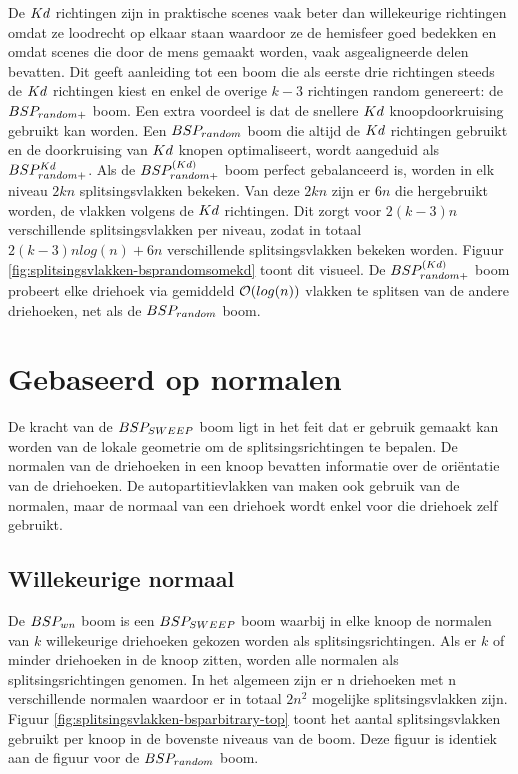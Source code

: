 De $Kd$ richtingen zijn in praktische scenes vaak beter dan willekeurige richtingen omdat ze loodrecht op elkaar staan waardoor ze de hemisfeer goed bedekken en omdat scenes die door de mens gemaakt worden, vaak asgealigneerde delen bevatten.
Dit geeft aanleiding tot een boom die als eerste drie richtingen steeds de $Kd$ richtingen kiest en enkel de overige $k - 3$ richtingen random genereert: de $BSP_{random+}$ boom. Een extra voordeel is dat de snellere $Kd$ knoopdoorkruising gebruikt kan worden. Een $BSP_{random}$ boom die altijd de $Kd$ richtingen gebruikt en de doorkruising van $Kd$ knopen optimaliseert, wordt aangeduid als $BSP^{Kd}_{random+}$. 
Als de $BSP^{(Kd)}_{random+}$ boom perfect gebalanceerd is, worden in elk niveau $2kn$ splitsingsvlakken bekeken.
Van deze $2kn$ zijn er $6n$ die hergebruikt worden, de vlakken volgens de $Kd$ richtingen.
Dit zorgt voor $2(k-3)n$ verschillende splitsingsvlakken per niveau, zodat in totaal $2(k-3)nlog(n) + 6n$ verschillende splitsingsvlakken bekeken worden.
Figuur \ref{fig:splitsingsvlakken-bsprandomsomekd} toont dit visueel.
De $BSP^{(Kd)}_{random+}$ boom probeert elke driehoek via gemiddeld $\mathcal{O}(log(n))$ vlakken te splitsen van de andere driehoeken, net als  de $BSP_{random}$ boom.\\

\section{Gebaseerd op normalen}
    De kracht van de $BSP_{SWEEP}$ boom ligt in het feit dat er gebruik gemaakt kan worden van de lokale geometrie om de splitsingsrichtingen te bepalen.
    De normalen van de driehoeken in een knoop bevatten informatie over de oriëntatie van de driehoeken.
    De autopartitievlakken van \authorIze{} maken ook gebruik van de normalen, maar de normaal van een driehoek wordt enkel voor die driehoek zelf gebruikt.
    
\subsection{Willekeurige normaal}
    De $BSP_{wn}$ boom is een $BSP_{SWEEP}$ boom waarbij in elke knoop de normalen van $k$ willekeurige driehoeken gekozen worden als splitsingsrichtingen.
    Als er $k$ of minder driehoeken in de knoop zitten, worden alle normalen als splitsingsrichtingen genomen.
    In het algemeen zijn er n driehoeken met n verschillende normalen waardoor er in totaal $2n^2$ mogelijke splitsingsvlakken zijn.
    Figuur \ref{fig:splitsingsvlakken-bsparbitrary-top} toont het aantal splitsingsvlakken gebruikt per knoop in de bovenste niveaus van de boom.
    Deze figuur is identiek aan de figuur voor de $BSP_{random}$ boom. \\


